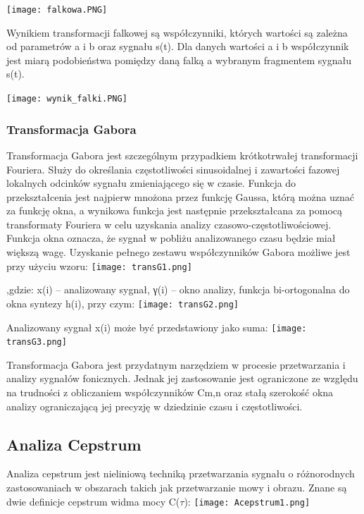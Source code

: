 \documentclass[a4paper,titleauthor]{mwart}
\begin{document}
	\texttt{[image: falkowa.PNG]}
	
	Wynikiem transformacji falkowej są współczynniki, których wartości są zależna od parametrów a i b oraz sygnału s(t). Dla danych wartości a i b współczynnik jest miarą podobieństwa pomiędzy daną falką a wybranym fragmentem sygnału s(t).\newline
	
	\texttt{[image: wynik\_falki.PNG]}
	
	\subsubsection{Transformacja Gabora}
	Transformacja Gabora  jest szczególnym przypadkiem krótkotrwałej transformacji Fouriera. Służy do określania częstotliwości sinusoidalnej i zawartości fazowej lokalnych odcinków sygnału zmieniającego się w czasie. Funkcja do przekształcenia jest najpierw mnożona przez funkcję Gaussa, którą można uznać za funkcję okna, a wynikowa funkcja jest następnie przekształcana za pomocą transformaty Fouriera w celu uzyskania analizy czasowo-częstotliwościowej. Funkcja okna oznacza, że sygnał w pobliżu analizowanego czasu będzie miał większą wagę. 
	Uzyskanie pełnego zestawu współczynników Gabora możliwe jest przy użyciu wzoru:\newline
	\texttt{[image: transG1.png]}
	
	,gdzie: x(i) – analizowany sygnał, γ(i) – okno analizy, funkcja bi-ortogonalna do okna syntezy h(i), przy czym:\newline
	\texttt{[image: transG2.png]}
	
	Analizowany sygnał x(i) może być przedstawiony jako suma:\newline
	\texttt{[image: transG3.png]}
	
	Transformacja Gabora jest przydatnym narzędziem w procesie przetwarzania i analizy sygnałów fonicznych. Jednak jej zastosowanie jest ograniczone ze względu na trudności z obliczaniem współczynników Cm,n oraz stałą szerokość okna analizy ograniczającą jej precyzję w dziedzinie czasu i częstotliwości.
	\subsection{Analiza Cepstrum}
	Analiza cepstrum jest nieliniową techniką przetwarzania sygnału o różnorodnych zastosowaniach w obszarach takich jak przetwarzanie mowy i obrazu.
	Znane są dwie definicje cepstrum widma mocy C($\tau$):\newline
	\texttt{[image: Acepstrum1.png]}
	
\end{document}
